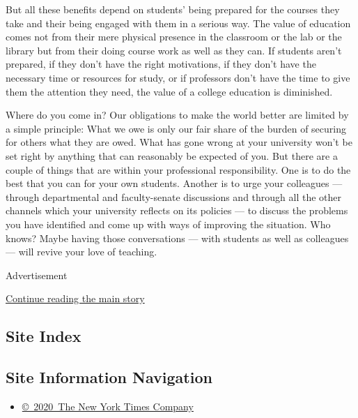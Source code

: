 But all these benefits depend on students' being prepared for the
courses they take and their being engaged with them in a serious way.
The value of education comes not from their mere physical presence in
the classroom or the lab or the library but from their doing course work
as well as they can. If students aren't prepared, if they don't have the
right motivations, if they don't have the necessary time or resources
for study, or if professors don't have the time to give them the
attention they need, the value of a college education is diminished.

Where do you come in? Our obligations to make the world better are
limited by a simple principle: What we owe is only our fair share of the
burden of securing for others what they are owed. What has gone wrong at
your university won't be set right by anything that can reasonably be
expected of you. But there are a couple of things that are within your
professional responsibility. One is to do the best that you can for your
own students. Another is to urge your colleagues --- through
departmental and faculty-senate discussions and through all the other
channels which your university reflects on its policies --- to discuss
the problems you have identified and come up with ways of improving the
situation. Who knows? Maybe having those conversations --- with students
as well as colleagues --- will revive your love of teaching.

Advertisement

\protect\hyperlink{after-bottom}{Continue reading the main story}

\hypertarget{site-index}{%
\subsection{Site Index}\label{site-index}}

\hypertarget{site-information-navigation}{%
\subsection{Site Information
Navigation}\label{site-information-navigation}}

\begin{itemize}
\tightlist
\item
  \href{https://help.nytimes3xbfgragh.onion/hc/en-us/articles/115014792127-Copyright-notice}{©~2020~The
  New York Times Company}
\end{itemize}

